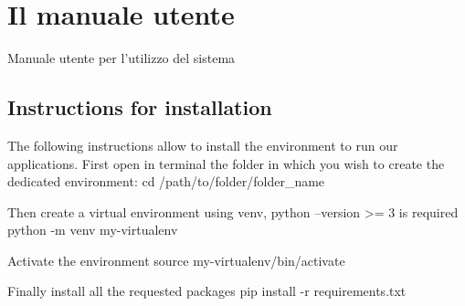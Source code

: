 \chapter{Il manuale utente}
\label{appendiceD}
\thispagestyle{empty}

\noindent Manuale utente per l'utilizzo del sistema


\section{Instructions for installation}

The following instructions allow to install the environment to run our applications. 
First open in terminal the folder in which you wish to create the dedicated environment:
cd /path/to/folder/folder_name


Then create a virtual environment using venv, python --version >= 3 is required
python -m venv my-virtualenv

Activate the environment
source my-virtualenv/bin/activate

Finally  install all the requested packages 
pip install -r requirements.txt

